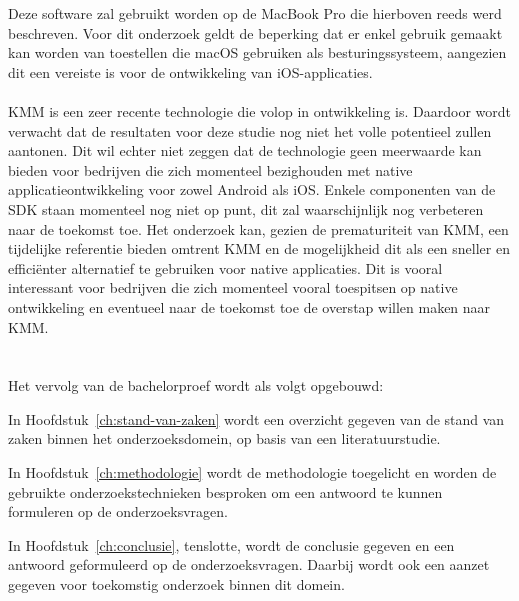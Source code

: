 Deze software zal gebruikt worden op de MacBook Pro die hierboven reeds werd beschreven. Voor dit onderzoek geldt de beperking dat er enkel gebruik gemaakt kan worden van toestellen die macOS gebruiken als besturingssysteem, aangezien dit een vereiste is voor de ontwikkeling van iOS-applicaties.
\\ \\ 
KMM is een zeer recente technologie die volop in ontwikkeling is. Daardoor wordt verwacht dat de resultaten voor deze studie nog niet het volle potentieel zullen aantonen. Dit wil echter niet zeggen dat de technologie geen meerwaarde kan bieden voor bedrijven die zich momenteel bezighouden met native applicatieontwikkeling voor zowel Android als iOS. Enkele componenten van de SDK staan momenteel nog niet op punt, dit zal waarschijnlijk nog verbeteren naar de toekomst toe. Het onderzoek kan, gezien de prematuriteit van KMM, een tijdelijke referentie bieden omtrent KMM en de mogelijkheid dit als een sneller en efficiënter alternatief te gebruiken voor native applicaties. Dit is vooral interessant voor bedrijven die zich momenteel vooral toespitsen op native ontwikkeling en eventueel naar de toekomst toe de overstap willen maken naar KMM. 


\section{}
\label{sec:opzet-bachelorproef}


Het vervolg van de bachelorproef wordt als volgt opgebouwd:

In Hoofdstuk~\ref{ch:stand-van-zaken} wordt een overzicht gegeven van de stand van zaken binnen het onderzoeksdomein, op basis van een literatuurstudie.

In Hoofdstuk~\ref{ch:methodologie} wordt de methodologie toegelicht en worden de gebruikte onderzoekstechnieken besproken om een antwoord te kunnen formuleren op de onderzoeksvragen.


In Hoofdstuk~\ref{ch:conclusie}, tenslotte, wordt de conclusie gegeven en een antwoord geformuleerd op de onderzoeksvragen. Daarbij wordt ook een aanzet gegeven voor toekomstig onderzoek binnen dit domein.